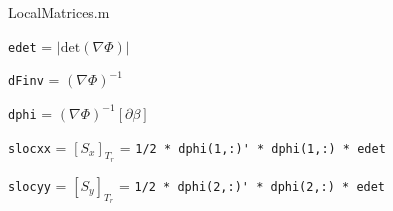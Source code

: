 \noindent LocalMatrices.m

\verb|edet| = $\vert \mathrm{det} \left(\nabla \Phi \right) \vert$

\verb|dFinv| = $\left(\nabla \Phi \right)^{-1}$

\verb|dphi| = $\left(\nabla \Phi \right)^{-1} \left[\partial \beta\right]$

\verb|slocxx| = $\left[ S_x \right]_{T_r}$ = \verb|1/2 * dphi(1,:)' * dphi(1,:) * edet|

\verb|slocyy| = $\left[ S_y \right]_{T_r}$ = \verb|1/2 * dphi(2,:)' * dphi(2,:) * edet|








